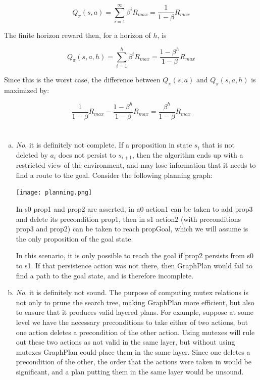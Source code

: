 \documentclass{article}
\begin{document}
\[
Q_\pi(s,a) = \sum_{i = 1}^{\infty} \beta^i R_{max} =
\frac{1}{1-\beta}R_{max}
\]

The finite horizon reward then, for a horizon of $h$, is

\[
Q_\pi(s,a,h) = \sum_{i = 1}^{h} \beta^i R_{max} = 
\frac{1-\beta^h}{1-\beta}R_{max}
\]

Since this is the worst case, the difference between $Q_\pi(s,a)$ and
$Q_\pi(s,a,h)$ is maximized by:

\[
\frac{1}{1-\beta}R_{max} - \frac{1-\beta^h}{1-\beta}R_{max} =
\frac{\beta^h}{1-\beta}R_{max}
\]

\newpage


\section{}
\begin{enumerate}[(a)]
\item
\emph{No}, it is definitely not complete. If a proposition in state
$s_i$ that is not deleted by $a_i$ does not persist to $s_{i+1}$, then the
algorithm ends up with a restricted view of the environment, and may lose
information that it needs to find a route to the goal. Consider the following
planning graph:

\begin{center}

\texttt{[image: planning.png]}

\end{center}

In s0 prop1 and prop2 are asserted, in a0 action1 can be taken to add 
prop3 and delete its precondition prop1, then in s1 action2
(with preconditions prop3 and prop2) can be taken to reach propGoal, which we
will assume is the only proposition of the goal state.

\vspace{1em}

In this scenario, it is only possible to reach the goal if prop2 persists from
s0 to s1. If that persistence action was not there, then GraphPlan would
fail to find a path to the goal state, and is therefore incomplete.

\item
\emph{No}, it is definitely not sound. The purpose of computing mutex
relations is not only to prune the search tree, making GraphPlan
more efficient, but also to ensure that it produces valid layered plans. For
example, suppose at some level we have the necessary preconditions to take
either of two actions, but one action deletes
a precondition of the other action. Using mutexes will rule out these two
actions as not valid in the same layer, but without using mutexes GraphPlan
could place them in the same layer. Since one deletes a precondition of the
other, the order that the actions were taken in would be significant, and a plan
putting them in the same layer would be unsound.

\end{enumerate}

\newpage


\section{}
\end{document}
